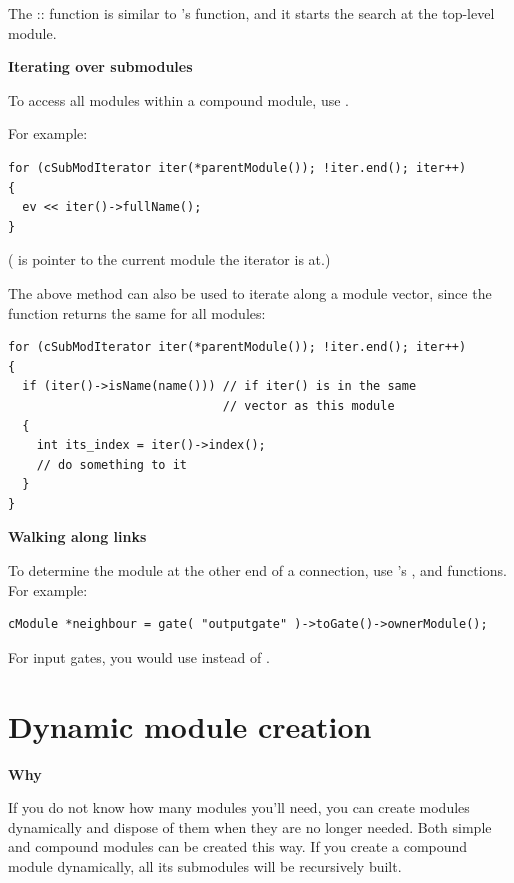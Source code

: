 The :: function is similar
to 's  function, and it
starts the search at the top-level module.


\textbf{Iterating over submodules}


To access all modules within a compound module,
use .

For example:

\begin{verbatim}
for (cSubModIterator iter(*parentModule()); !iter.end(); iter++)
{
  ev << iter()->fullName();
}
\end{verbatim}

( is pointer to the current module the iterator is at.)


The above method can also be used to iterate along a module
vector, since the 
function returns the same for all modules:

\begin{verbatim}
for (cSubModIterator iter(*parentModule()); !iter.end(); iter++)
{
  if (iter()->isName(name())) // if iter() is in the same
                              // vector as this module
  {
    int its_index = iter()->index();
    // do something to it
  }
}
\end{verbatim}


\textbf{Walking along links}


To determine the module at the other end of a connection, use
's ,  and
 functions. For example:

\begin{verbatim}
cModule *neighbour = gate( "outputgate" )->toGate()->ownerModule();
\end{verbatim}


For input gates, you would use  instead of .





\section{Dynamic module creation}

\textbf{Why}


If you do not know how many modules you'll need, you can create
modules dynamically and dispose of them
when they are no longer needed. Both simple and compound modules
can be created this way. If you create a compound module dynamically,
all its submodules will be recursively built.


